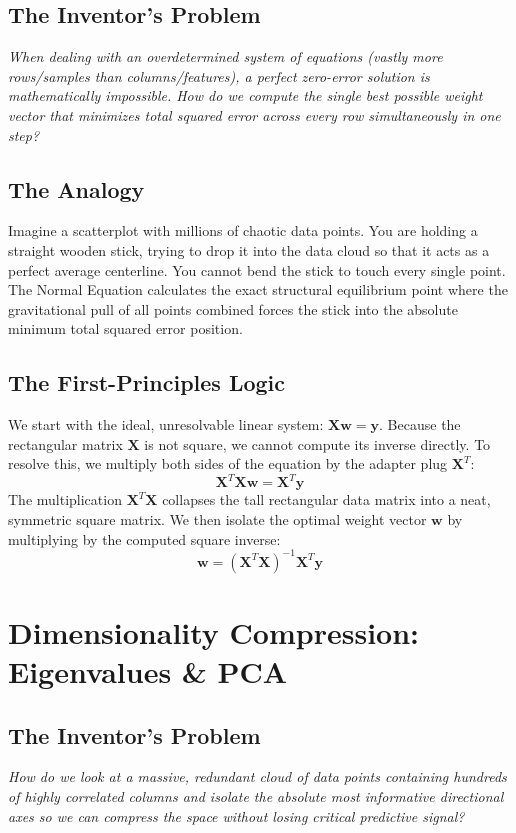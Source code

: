 \documentclass[12pt,a4paper]{article}
\begin{document}
\subsection*{The Inventor's Problem}
\textit{When dealing with an overdetermined system of equations (vastly more rows/samples than columns/features), a perfect zero-error solution is mathematically impossible. How do we compute the single best possible weight vector that minimizes total squared error across every row simultaneously in one step?}

\subsection*{The Analogy}
Imagine a scatterplot with millions of chaotic data points. You are holding a straight wooden stick, trying to drop it into the data cloud so that it acts as a perfect average centerline. You cannot bend the stick to touch every single point. The Normal Equation calculates the exact structural equilibrium point where the gravitational pull of all points combined forces the stick into the absolute minimum total squared error position.

\subsection*{The First-Principles Logic}
We start with the ideal, unresolvable linear system: $\mathbf{X}\mathbf{w} = \mathbf{y}$. Because the rectangular matrix $\mathbf{X}$ is not square, we cannot compute its inverse directly. To resolve this, we multiply both sides of the equation by the adapter plug $\mathbf{X}^T$:
$$\mathbf{X}^T\mathbf{X}\mathbf{w} = \mathbf{X}^T\mathbf{y}$$
The multiplication $\mathbf{X}^T\mathbf{X}$ collapses the tall rectangular data matrix into a neat, symmetric square matrix. We then isolate the optimal weight vector $\mathbf{w}$ by multiplying by the computed square inverse:
$$\mathbf{w} = (\mathbf{X}^T\mathbf{X})^{-1}\mathbf{X}^T\mathbf{y}$$

\section{Dimensionality Compression: Eigenvalues \& PCA}
\subsection*{The Inventor's Problem}
\textit{How do we look at a massive, redundant cloud of data points containing hundreds of highly correlated columns and isolate the absolute most informative directional axes so we can compress the space without losing critical predictive signal?}
\end{document}
